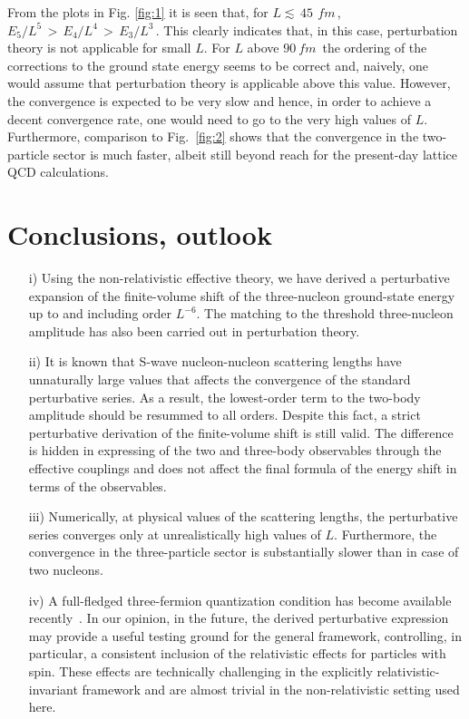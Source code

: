 \documentclass[12pt,prd,tightenlines,nofootinbib]{revtex4-2}
\begin{document}
  
  From the plots in Fig. \ref{fig:1} it is seen that, for $L \lesssim\, 45\, \SI{}{fm}\,$,
  ${E_{5}}/{L^{5}}\, >\,{E_{4}}/{L^{4}}\,>\,{E_{3}}/{L^{3}}\,$.
  This clearly indicates that, in this case, perturbation theory is not applicable for small $L$.
  For $L$ above $ \SI{90}{fm}\,$ the ordering of the corrections to the ground state
  energy seems to be correct and, naively, one would assume that perturbation theory is applicable above this value. However, the convergence is expected to be very slow
  and hence, in order to achieve a decent convergence rate, one would need to go
  to the very high values of $L$. Furthermore, comparison to Fig.~\ref{fig:2} shows that
  the convergence in the two-particle sector is much faster, albeit still beyond reach for
  the present-day lattice QCD calculations.

  
\section{Conclusions, outlook}

\begin{itemize}

\item[i)]
  Using the non-relativistic effective theory, 
  we have derived a perturbative expansion of the finite-volume shift of the
  three-nucleon ground-state energy
  up to and including order $L^{-6}$. The matching to the threshold three-nucleon
  amplitude has also been carried out in perturbation theory.

\item[ii)]
  It is known that S-wave nucleon-nucleon scattering lengths have unnaturally large values
  that affects the convergence of the standard perturbative series. As a result,
  the lowest-order term to the two-body amplitude should be resummed to all orders.
  Despite this fact, a strict perturbative derivation of the finite-volume shift is still valid.
  The difference is hidden in expressing of the two and three-body observables
  through the effective couplings and does not affect the final formula of the energy
  shift in terms of the observables.
  
\item[iii)]
  Numerically, at physical values of the scattering lengths, the perturbative series converges
  only at unrealistically high values of $L$. Furthermore, the convergence in the
  three-particle sector is substantially slower than in case of two nucleons.

\item[iv)]
  A full-fledged three-fermion quantization condition has become available recently~\cite{Draper:2023xvu}. In our opinion,
  in the future, the derived perturbative expression may provide a useful testing ground
  for the general framework, controlling, in particular, a consistent inclusion of the
  relativistic effects for particles with spin. These effects are technically challenging in
  the explicitly relativistic-invariant framework and are almost trivial in the non-relativistic
  setting used here.

\end{itemize}
\end{document}

